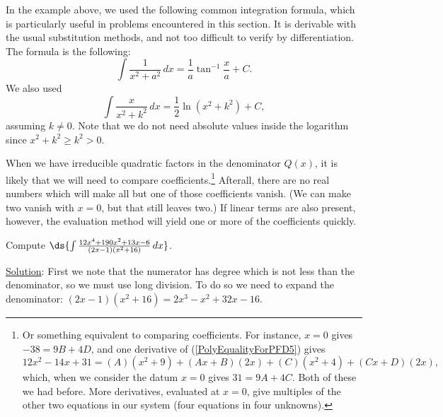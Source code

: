 In the example above, we used the following common integration formula,
which is particularly useful in problems encountered in this section.
It is derivable with the usual substitution methods, and not too difficult
to verify by differentiation.  The formula is the following:
\begin{equation}
\int\frac1{x^2+a^2}\,dx=\frac1a\tan^{-1}\frac{x}a+C.
\label{Int1/(x^2+a^2)}\end{equation}
We also used 
$$\int\frac{x}{x^2+k^2}\,dx=\frac12\ln(x^2+k^2)+C,$$
assuming $k\ne0$.  Note that we do not need absolute values
inside the logarithm since $x^2+k^2\ge k^2>0$.

When we have irreducible quadratic factors in the denominator
$Q(x)$, it is likely that we will need to compare coefficients.\footnote{%
Or something equivalent to comparing coefficients.  For instance,
$x=0$ gives $-38=9B+4D$, and one derivative of (\ref{PolyEqualityForPFD5})
gives 
$$12x^2-14x+31=(A)(x^2+9)+(Ax+B)(2x)+(C)(x^2+4)+(Cx+D)(2x),$$
which, when we consider the datum $x=0$ gives
$31=9A+4C$.  Both of these we had before.  More derivatives,
evaluated at $x=0$,  give
multiples of the other two equations in our system (four equations in four
unknowns).%
}
Afterall, there are no real numbers which will make all but
one of those coefficients vanish.  (We can make two vanish with $x=0$,
but that still leaves two.)  If linear terms are also present, however,
the evaluation method will yield one or more of the coefficients quickly.

\bex Compute $\ds{\int\frac{12x^4+190x^2+13x-6}{(2x-1)(x^2+16)}\,dx}$.

\underline{Solution}: First we note that the numerator has degree
which is not less than the denominator, so we must use long division.
To do so we need to expand the denominator:
$(2x-1)(x^2+16)=2x^3-x^2+32x-16$.

